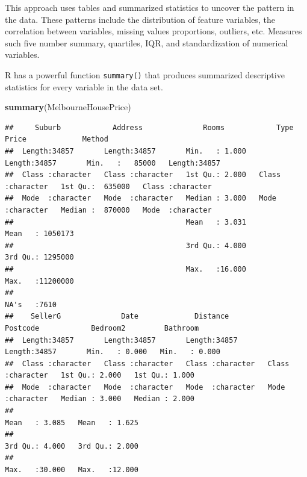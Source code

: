 \documentclass[
]{book}
\newenvironment{Shaded}{\begin{snugshade}}{\end{snugshade}}
\newcommand{\FunctionTok}[1]{\textcolor[rgb]{0.13,0.29,0.53}{\textbf{#1}}}
\newcommand{\NormalTok}[1]{#1}
\begin{document}
This approach uses tables and summarized statistics to uncover the pattern in the data. These patterns include the distribution of feature variables, the correlation between variables, missing values proportions, outliers, etc. Measures such five number summary, quartiles, IQR, and standardization of numerical variables.

R has a powerful function \texttt{summary()} that produces summarized descriptive statistics for every variable in the data set.

\begin{Shaded}
\begin{Highlighting}[]
\FunctionTok{summary}\NormalTok{(MelbourneHousePrice)}
\end{Highlighting}
\end{Shaded}

\begin{verbatim}
##     Suburb            Address              Rooms            Type               Price             Method         
##  Length:34857       Length:34857       Min.   : 1.000   Length:34857       Min.   :   85000   Length:34857      
##  Class :character   Class :character   1st Qu.: 2.000   Class :character   1st Qu.:  635000   Class :character  
##  Mode  :character   Mode  :character   Median : 3.000   Mode  :character   Median :  870000   Mode  :character  
##                                        Mean   : 3.031                      Mean   : 1050173                     
##                                        3rd Qu.: 4.000                      3rd Qu.: 1295000                     
##                                        Max.   :16.000                      Max.   :11200000                     
##                                                                            NA's   :7610                         
##    SellerG              Date             Distance           Postcode            Bedroom2         Bathroom     
##  Length:34857       Length:34857       Length:34857       Length:34857       Min.   : 0.000   Min.   : 0.000  
##  Class :character   Class :character   Class :character   Class :character   1st Qu.: 2.000   1st Qu.: 1.000  
##  Mode  :character   Mode  :character   Mode  :character   Mode  :character   Median : 3.000   Median : 2.000  
##                                                                              Mean   : 3.085   Mean   : 1.625  
##                                                                              3rd Qu.: 4.000   3rd Qu.: 2.000  
##                                                                              Max.   :30.000   Max.   :12.000  

\end{verbatim}
\end{document}
